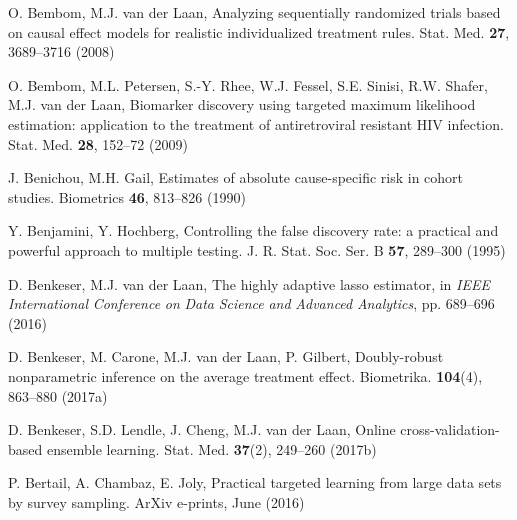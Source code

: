 \begin{list}{}{\setlength{\leftmargin}{2.1em}\setlength{\labelwidth}{0pt}
  \setlength{\labelsep}{0pt}\setlength{\itemindent}{-2.1em}
  \setlength{\parsep}{0pt}\setlength{\itemsep}{2pt}\setlength{\topsep}{0pt}}
\item\label{refentry:REF026}O. Bembom, M.J. van der Laan, Analyzing sequentially randomized trials based on causal effect models for realistic individualized treatment rules. Stat. Med. \textbf{27}, 3689--3716 (2008)\label{refend:REF026}
\item\label{refentry:REF027}O. Bembom, M.L. Petersen, S.-Y. Rhee, W.J. Fessel, S.E. Sinisi, R.W. Shafer, M.J. van der Laan, Biomarker discovery using targeted maximum likelihood estimation: application to the treatment of antiretroviral resistant HIV infection. Stat. Med. \textbf{28}, 152--72 (2009)\label{refend:REF027}
\item\label{refentry:REF028}J. Benichou, M.H. Gail, Estimates of absolute cause-specific risk in cohort studies. Biometrics \textbf{46}, 813--826 (1990)\label{refend:REF028}
\item\label{refentry:REF029}Y. Benjamini, Y. Hochberg, Controlling the false discovery rate: a practical and powerful approach to multiple testing. J. R. Stat. Soc. Ser. B \textbf{57}, 289--300 (1995)\label{refend:REF029}
\item\label{refentry:REF030}D. Benkeser, M.J. van der Laan, The highly adaptive lasso estimator, in \textit{IEEE} \textit{International} \textit{Conference} \textit{on} \textit{Data} \textit{Science} \textit{and} \textit{Advanced} \textit{Analytics}, pp. 689--696 (2016)\label{refend:REF030}
\item\label{refentry:REF031}D. Benkeser, M. Carone, M.J. van der Laan, P. Gilbert, Doubly-robust nonparametric inference on the average treatment effect. Biometrika. \textbf{104}(4), 863--880 (2017a)\label{refend:REF031}
\item\label{refentry:REF032}D. Benkeser, S.D. Lendle, J. Cheng, M.J. van der Laan, Online cross-validation-based ensemble learning. Stat. Med. \textbf{37}(2), 249--260 (2017b)\label{refend:REF032}
\item\label{refentry:REF033}P. Bertail, A. Chambaz, E. Joly, Practical targeted learning from large data sets by survey sampling. ArXiv e-prints, June (2016)\label{refend:REF033}

\end{list}
